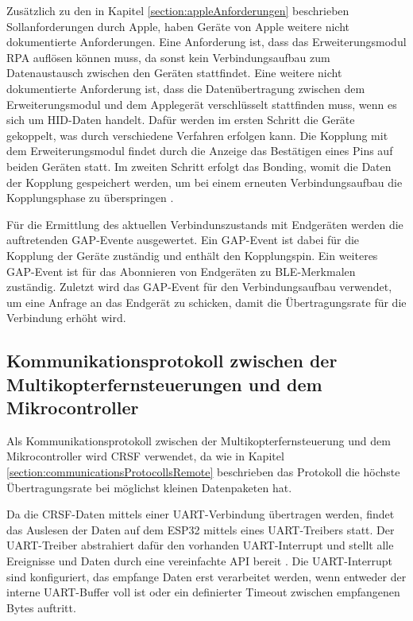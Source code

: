 Zusätzlich zu den in Kapitel \ref{section:appleAnforderungen} beschrieben Sollanforderungen durch Apple, haben Geräte von Apple weitere nicht dokumentierte Anforderungen. Eine Anforderung ist, dass das Erweiterungsmodul \ac{RPA} auflösen können muss, da sonst kein Verbindungsaufbau zum Datenaustausch zwischen den Geräten stattfindet. Eine weitere nicht dokumentierte Anforderung ist, dass die Datenübertragung zwischen dem Erweiterungsmodul und dem Applegerät verschlüsselt stattfinden muss, wenn es sich um \ac{HID}-Daten handelt. Dafür werden im ersten Schritt die Geräte gekoppelt, was durch verschiedene Verfahren erfolgen kann. Die Kopplung mit dem Erweiterungsmodul findet durch die Anzeige das Bestätigen eines Pins auf beiden Geräten statt. Im zweiten Schritt erfolgt das Bonding, womit die Daten der Kopplung gespeichert werden, um bei einem erneuten Verbindungsaufbau die Kopplungsphase zu überspringen \cite{kyneticsBondingPairng}.

Für die Ermittlung des aktuellen Verbindunszustands mit Endgeräten werden die auftretenden \ac{GAP}-Evente ausgewertet. Ein \ac{GAP}-Event ist dabei für die Kopplung der Geräte zuständig und enthält den Kopplungspin. Ein weiteres \ac{GAP}-Event ist für das Abonnieren von Endgeräten zu \ac{BLE}-Merkmalen zuständig. Zuletzt wird das \ac{GAP}-Event für den Verbindungsaufbau verwendet, um eine Anfrage an das Endgerät zu schicken, damit die Übertragungsrate für die Verbindung erhöht wird.

\subsection{Kommunikationsprotokoll zwischen der Multikopterfernsteuerungen und dem Mikrocontroller}
Als Kommunikationsprotokoll zwischen der Multikopterfernsteuerung und dem Mikrocontroller wird CRSF verwendet, da wie in Kapitel \ref{section:communicationsProtocollsRemote} beschrieben das Protokoll die höchste Übertragungsrate bei möglichst kleinen Datenpaketen hat.

Da die CRSF-Daten mittels einer \ac{UART}-Verbindung übertragen werden, findet das Auslesen der Daten auf dem ESP32 mittels eines \ac{UART}-Treibers statt. Der \ac{UART}-Treiber abstrahiert dafür den vorhanden \ac{UART}-Interrupt und stellt alle Ereignisse und Daten durch eine vereinfachte API bereit \cite{espUARTDriver}. Die \ac{UART}-Interrupt sind konfiguriert, das empfange Daten erst verarbeitet werden, wenn entweder der interne \ac{UART}-Buffer voll ist oder ein definierter Timeout zwischen empfangenen Bytes auftritt.

